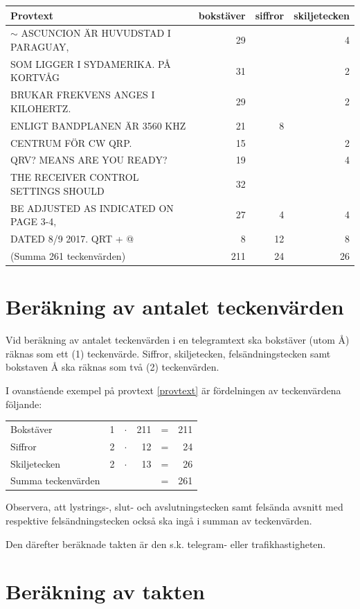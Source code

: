 \begin{tabular}{l|r|r|r|}
	Provtext & bokstäver & siffror & skiljetecken\\ \hline
	$\sim$ ASCUNCION ÄR HUVUDSTAD I PARAGUAY, & 29 & & 4\\
	SOM LIGGER I SYDAMERIKA. PÅ KORTVÅG & 31 & & 2\\
	BRUKAR FREKVENS ANGES I KILOHERTZ. & 29 & & 2\\
	ENLIGT BANDPLANEN ÄR 3560 KHZ & 21 & 8 &\\
	CENTRUM FÖR CW QRP. & 15& & 2\\
	QRV? MEANS ARE YOU READY? & 19 & & 4 \\
	THE RECEIVER CONTROL SETTINGS SHOULD & 32 & &\\
	BE ADJUSTED AS INDICATED ON PAGE 3-4, & 27 & 4 & 4\\
	DATED 8/9 2017. QRT + @ & 8 & 12 & 8\\ \hline
	(Summa 261 teckenvärden)& 211 & 24 & 26\\
\end{tabular}
\label{provtext}

\section[Teckenvärden]{Beräkning av antalet teckenvärden}

Vid beräkning av antalet teckenvärden i en telegramtext ska bokstäver (utom Å)
räknas som ett (1) teckenvärde.
Siffror, skiljetecken, felsändningstecken samt bokstaven Å ska räknas som två
(2) teckenvärden.

I ovanstående exempel på provtext \ref{provtext} är fördelningen av
teckenvärdena följande:

\begin{tabular}{lrcrcr}
	Bokstäver          & 1 & $\cdot$ & 211 & = & 211 \\
	Siffror            & 2 & $\cdot$ & 12  & = & 24  \\
	Skiljetecken       & 2 & $\cdot$ & 13  & = & 26  \\
	Summa teckenvärden &   &         &     & = & 261
\end{tabular}

Observera, att lystrings-, slut- och avslutningstecken samt felsända avsnitt med
respektive felsändningstecken också ska ingå i summan av teckenvärden.

Den därefter beräknade takten är den s.k. telegram- eller trafikhastigheten.

\section[Taktberäkning]{Beräkning av takten}


